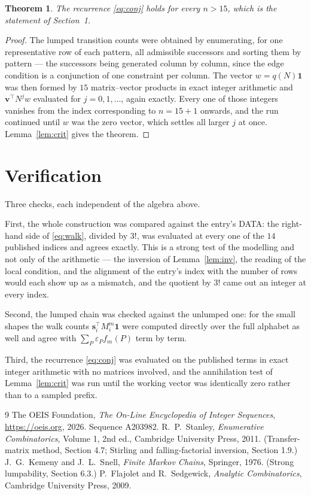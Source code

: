 \documentclass[11pt,a4paper]{article}
\theoremstyle{plain}
\newtheorem{theorem}{Theorem}
\theoremstyle{definition}
\begin{document}
\begin{theorem}
The recurrence \eqref{eq:conj} holds for every $n>15$, which is the statement of
Section~1.
\end{theorem}

\begin{proof}
The lumped transition counts were obtained by enumerating, for one representative row of
each pattern, all admissible successors and sorting them by pattern --- the successors being
generated column by column, since the edge condition is a conjunction of one constraint per
column. The vector $w=q(N)\mathbf{1}$ was then formed by $15$ matrix--vector products
in exact integer arithmetic and $\mathbf{v}^{\!\top}N^{j}w$ evaluated for
$j=0,1,\dots$, again exactly. Every one of those integers vanishes from the index
corresponding to $n=15+1$ onwards, and the run continued until $w$ was the zero vector,
which settles all larger $j$ at once. Lemma~\ref{lem:crit} gives the theorem.
\end{proof}

\section{Verification}

Three checks, each independent of the algebra above.

First, the whole construction was compared against the entry's DATA: the right-hand side of
\eqref{eq:walk}, divided by $3!$, was evaluated at every one of the $14$
published indices and agrees exactly. This is a strong test of the modelling and not only of
the arithmetic --- the inversion of Lemma~\ref{lem:inv}, the reading of the local
condition, and the alignment of the entry's index with the number of rows would each
show up as a mismatch, and the quotient by $3!$ came out an integer at every index.

Second, the lumped chain was checked against the unlumped one: for the small shapes the walk
counts $\mathbf{s}_i^{\!\top}M_i^{m}\mathbf{1}$ were computed directly over the full
alphabet as well and agree with $\sum_P\varepsilon_Pf_m(P)$ term by term.

Third, the recurrence \eqref{eq:conj} was evaluated on the published terms in exact integer
arithmetic with no matrices involved, and the annihilation test of Lemma~\ref{lem:crit} was
run until the working vector was identically zero rather than to a sampled prefix.

\begin{thebibliography}{9}
 The OEIS Foundation, \emph{The On-Line Encyclopedia of Integer
Sequences}, \url{https://oeis.org}, 2026. Sequence A203982.
 R.~P.~Stanley, \emph{Enumerative Combinatorics}, Volume 1, 2nd ed.,
Cambridge University Press, 2011. (Transfer-matrix method, Section 4.7; Stirling and
falling-factorial inversion, Section 1.9.)
 J.~G.~Kemeny and J.~L.~Snell, \emph{Finite Markov Chains}, Springer,
1976. (Strong lumpability, Section 6.3.)
 P.~Flajolet and R.~Sedgewick, \emph{Analytic Combinatorics}, Cambridge
University Press, 2009.
\end{thebibliography}
\end{document}

